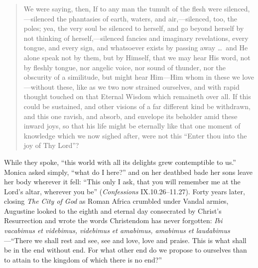 \begin{quote}
We were saying, then, If to any man the tumult of the flesh were silenced,---silenced the phantasies of earth, waters, and air,---silenced, too, the poles; yea, the very soul be silenced to herself, and go beyond herself by not thinking of herself,---silenced fancies and imaginary revelations, every tongue, and every sign, and whatsoever exists by passing away \dots\ and He alone speak not by them, but by Himself, that we may hear His word, not by fleshly tongue, nor angelic voice, nor sound of thunder, nor the obscurity of a similitude, but might hear Him---Him whom in these we love---without these, like as we two now strained ourselves, and with rapid thought touched on that Eternal Wisdom which remaineth over all. If this could be sustained, and other visions of a far different kind be withdrawn, and this one ravish, and absorb, and envelope its beholder amid these inward joys, so that his life might be eternally like that one moment of knowledge which we now sighed after, were not this ``Enter thou into the joy of Thy Lord''?
\end{quote}

While they spoke, ``this world with all its delights grew contemptible to us.'' Monica asked simply, ``what do I here?'' and on her deathbed bade her sons leave her body wherever it fell: ``This only I ask, that you will remember me at the Lord's altar, wherever you be'' (\textit{Confessions} IX.10.26--11.27). Forty years later, closing \textit{The City of God} as Roman Africa crumbled under Vandal armies, Augustine looked to the eighth and eternal day consecrated by Christ's Resurrection and wrote the words Christendom has never forgotten: \textit{Ibi vacabimus et videbimus, videbimus et amabimus, amabimus et laudabimus}---``There we shall rest and see, see and love, love and praise. This is what shall be in the end without end. For what other end do we propose to ourselves than to attain to the kingdom of which there is no end?''

